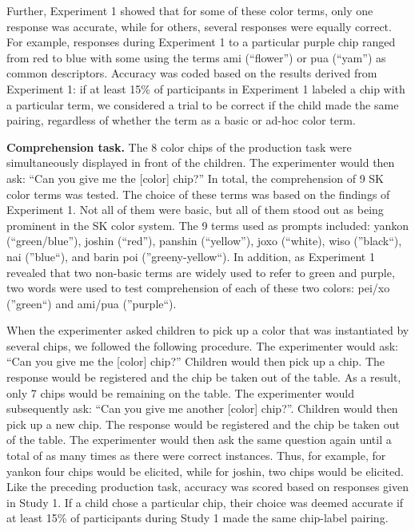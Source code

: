 \documentclass[floatsintext,man]{apa6}
\theoremstyle{definition}
\theoremstyle{definition}
\theoremstyle{definition}
\theoremstyle{remark}
\begin{document}
Further, Experiment 1 showed that for some of these color terms, only
one response was accurate, while for others, several responses were
equally correct. For example, responses during Experiment 1 to a
particular purple chip ranged from red to blue with some using the terms
ami (\enquote{flower}) or pua (\enquote{yam}) as common descriptors.
Accuracy was coded based on the results derived from Experiment 1: if at
least 15\% of participants in Experiment 1 labeled a chip with a
particular term, we considered a trial to be correct if the child made
the same pairing, regardless of whether the term as a basic or ad-hoc
color term.

\textbf{Comprehension task.} The 8 color chips of the production task
were simultaneously displayed in front of the children. The experimenter
would then ask: \enquote{Can you give me the {[}color{]} chip?} In
total, the comprehension of 9 SK color terms was tested. The choice of
these terms was based on the findings of Experiment 1. Not all of them
were basic, but all of them stood out as being prominent in the SK color
system. The 9 terms used as prompts included: yankon
(\enquote{green/blue}), joshin (\enquote{red}), panshin
(\enquote{yellow}), joxo (\enquote{white), wiso (}black\enquote{), nai
(}blue\enquote{), and barin poi (}greeny-yellow\enquote{). In addition,
as Experiment 1 revealed that two non-basic terms are widely used to
refer to green and purple, two words were used to test comprehension of
each of these two colors: pei/xo (}green\enquote{) and ami/pua
(}purple``).

When the experimenter asked children to pick up a color that was
instantiated by several chips, we followed the following procedure. The
experimenter would ask: \enquote{Can you give me the {[}color{]} chip?}
Children would then pick up a chip. The response would be registered and
the chip be taken out of the table. As a result, only 7 chips would be
remaining on the table. The experimenter would subsequently ask:
\enquote{Can you give me another {[}color{]} chip?}. Children would then
pick up a new chip. The response would be registered and the chip be
taken out of the table. The experimenter would then ask the same
question again until a total of as many times as there were correct
instances. Thus, for example, for yankon four chips would be elicited,
while for joshin, two chips would be elicited. Like the preceding
production task, accuracy was scored based on responses given in Study
1. If a child chose a particular chip, their choice was deemed accurate
if at least 15\% of participants during Study 1 made the same chip-label
pairing.
\end{document}
